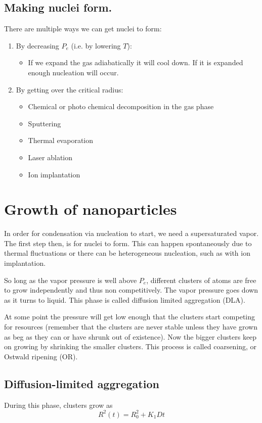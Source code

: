 \subsection{Making nuclei form.} There are multiple ways we can get nuclei to form:
\begin{enumerate}
\item By decreasing $P_e$ (i.e. by lowering $T$):
\begin{itemize}
\item If we expand the gas adiabatically it will cool down. If it is expanded enough nucleation will occur.
\end{itemize}
\item By getting over the critical radius:
\begin{itemize}
\item Chemical or photo chemical
decomposition in the gas phase
\item Sputtering
\item Thermal evaporation
\item Laser ablation
\item Ion implantation
\end{itemize}
\end{enumerate}

\section{Growth of nanoparticles}
In order for condensation via nucleation to start, we need a supersaturated vapor. The first step then, is for nuclei to form. This can happen spontaneously due to thermal fluctuations or there can be heterogeneous nucleation, such as with ion implantation.

So long as the vapor pressure is well above $P_e$, different clusters of atoms are free to grow independently and thus non competitively. The vapor pressure goes down as it turns to liquid. This phase is called diffusion limited aggregation (DLA). 

At some point the pressure will get low enough that the clusters start competing for resources (remember that the clusters are never stable unless they have grown as beg as they can or have shrunk out of existence). Now the bigger clusters keep on growing by shrinking the smaller clusters. This process is called coarsening, or Ostwald ripening (OR).

\subsection{Diffusion-limited aggregation}
During this phase, clusters grow as
\[ R^2(t) = R_0^2 + K_1Dt \]

